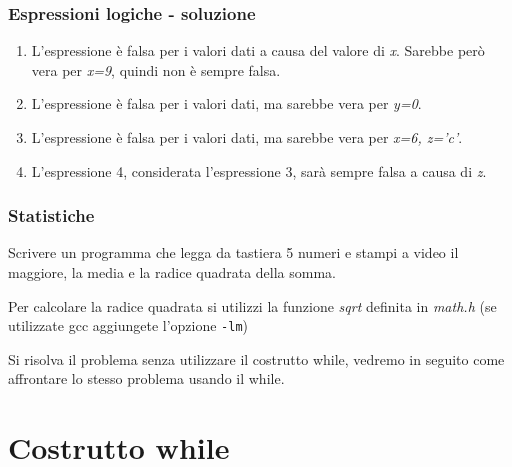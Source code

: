 \documentclass[format=169]{beamer}
\begin{document}
\begin{frame}
\frametitle{Espressioni logiche - soluzione}
\begin{enumerate}
\item L'espressione è falsa per i valori dati a causa del valore di \emph{x}. Sarebbe però vera per \emph{x=9}, quindi non è sempre falsa.

\item L'espressione è falsa per i valori dati, ma sarebbe vera per \emph{y=0}.

\item L'espressione è falsa per i valori dati, ma sarebbe vera per \emph{x=6, z='c'}.

\item L'espressione 4, considerata l'espressione 3, sarà sempre falsa a causa di \emph{z}.
\end{enumerate}
\end{frame}

\begin{frame}
\frametitle{Statistiche}
Scrivere un programma che legga da tastiera 5 numeri e stampi a video il maggiore, la media e la radice quadrata della somma.

Per calcolare la radice quadrata si utilizzi la funzione \emph{sqrt} definita in \emph{math.h} (se utilizzate gcc aggiungete l'opzione \texttt{-lm})

Si risolva il problema senza utilizzare il costrutto while, vedremo in seguito come affrontare lo stesso problema usando il while.
\end{frame}

\section{Costrutto while}
\end{document}
